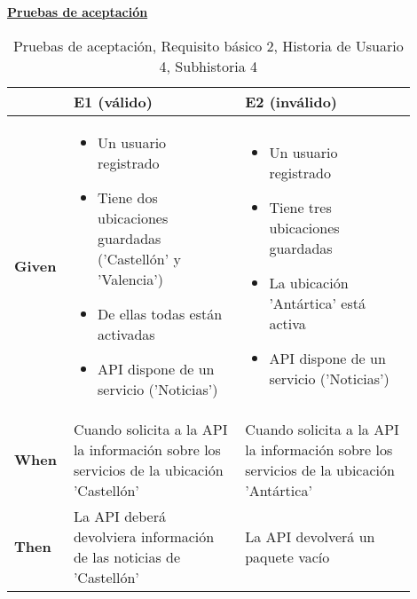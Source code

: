 \documentclass[../ei103948-project-documentation.tex]{subfiles}
\begin{document}
\begin{center}
						\textbf{\underline{Pruebas de aceptación}}
						\begin{table}[H]
							\centering
							\begin{tabular}{|p{0.10\linewidth}|p{0.40\linewidth}|p{0.40\linewidth}|}
								\hline
								\textbf{}      & \textbf{E1 (válido)}                                                                                                                                            & \textbf{E2 (inválido)}                                                                                                                                             \\ \hline
								\textbf{Given} &
								\begin{itemize}\vspace{-5mm}\setlength\itemsep{0mm}\setlength\parskip{0mm}\setlength{\itemindent}{-5mm} 
									\item Un usuario registrado
									\item Tiene dos ubicaciones guardadas ('Castellón' y 'Valencia')
									\item De ellas todas están activadas
									\item API dispone de un servicio ('Noticias')
								\end{itemize}& 
								\begin{itemize}\vspace{-5mm}\setlength\itemsep{0mm}\setlength\parskip{0mm}\setlength{\itemindent}{-5mm}
									\item Un usuario registrado
									\item Tiene tres ubicaciones guardadas
									\item La ubicación 'Antártica' está activa
									\item API dispone de un servicio ('Noticias')
								\end{itemize}\\ \hline
								\textbf{When}  & Cuando solicita a la API la información sobre los servicios de la ubicación 'Castellón'                                                                         & Cuando solicita a la API la información sobre los servicios de la ubicación 'Antártica'                                                                            \\ \hline
								\textbf{Then}  & La API deberá devolviera información de las noticias de 'Castellón'                                                                                              & La API devolverá un paquete vacío                                                                                                                                  \\ \hline
								\end{tabular}
							\caption{Pruebas de aceptación, Requisito básico 2, Historia de Usuario 4, Subhistoria 4}
						\end{table}
						\end{center}
\end{document}
